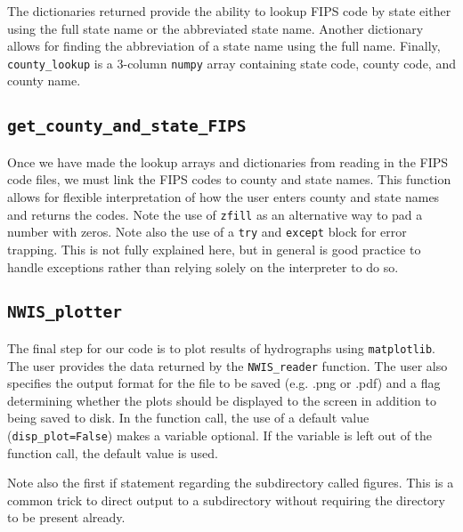 \documentclass[12pt]{article}
\begin{document}
The dictionaries returned provide the ability to lookup FIPS code by state either using the full state name or the abbreviated state name. Another dictionary allows for finding the abbreviation of a state name using the full name. Finally, \texttt{county\_lookup} is a 3-column \texttt{numpy} array containing state code, county code, and county name. 
\begin{center}
	
\end{center}

\subsection{\texttt{get\_county\_and\_state\_FIPS}}
Once we have made the lookup arrays and dictionaries from reading in the FIPS code files, we must link the FIPS codes to county and state names. This function allows for flexible interpretation of how the user enters county and state names and returns the codes. Note the use of \texttt{zfill} as an alternative way to pad a number with zeros. Note also the use of a \texttt{try} and \texttt{except} block for error trapping. This is not fully explained here, but in general is good practice to handle exceptions rather than relying solely on the interpreter to do so.
\begin{center}
	
\end{center}

\subsection{\texttt{NWIS\_plotter}}
The final step for our code is to plot results of hydrographs using \texttt{matplotlib}. The user provides the data returned by the \texttt{NWIS\_reader} function. The user also specifies the output format for the file to be saved (e.g. .png or .pdf) and a flag determining whether the plots should be displayed to the screen in addition to being saved to disk. In the function call, the use of a default value (\texttt{disp\_plot=False}) makes a variable optional. If the variable is left out of the function call, the default value is used.

Note also the first if statement regarding the subdirectory called figures. This is a common trick to direct output to a subdirectory without requiring the directory to be present already.
\end{document}
